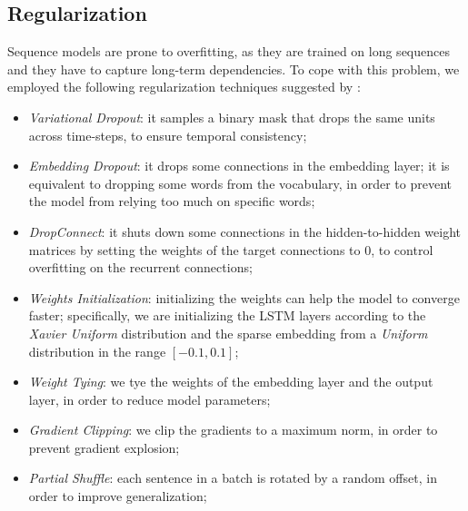 \subsection{Regularization}
Sequence models are prone to overfitting, as they are trained on long sequences and they have to capture long-term dependencies. To cope with this problem, we employed the following regularization techniques suggested by \cite{merity2017regularizing}:
\begin{itemize}
    \item \emph{Variational Dropout}\cite{gal2016theoretically}: it samples a binary mask that drops the same units across time-steps, to ensure temporal consistency;
    \item \emph{Embedding Dropout}\cite{gal2016theoretically}: it drops some connections in the embedding layer; it is equivalent to dropping some words from the vocabulary, in order to prevent the model from relying too much on specific words;
    \item \emph{DropConnect}\cite{wan2013dropconnect}: it shuts down some connections in the hidden-to-hidden weight matrices by setting the weights of the target connections to $0$, to control overfitting on the recurrent connections;
    \item \emph{Weights Initialization}: initializing the weights can help the model to converge faster; specifically, we are initializing the LSTM layers according to the  \emph{Xavier Uniform} distribution\cite{glorot2010understanding} and the sparse embedding from a  \emph{Uniform} distribution in the range \([-0.1, 0.1]\);
    \item \emph{Weight Tying}\cite{press2017tying}: we tye the weights of the embedding layer and the output layer, in order to reduce model parameters;
    \item \emph{Gradient Clipping}: we clip the gradients to a maximum norm, in order to prevent gradient explosion;
    \item \emph{Partial Shuffle}\cite{press2019partially}: each sentence in a batch is rotated by a random offset, in order to improve generalization;
\end{itemize}\
